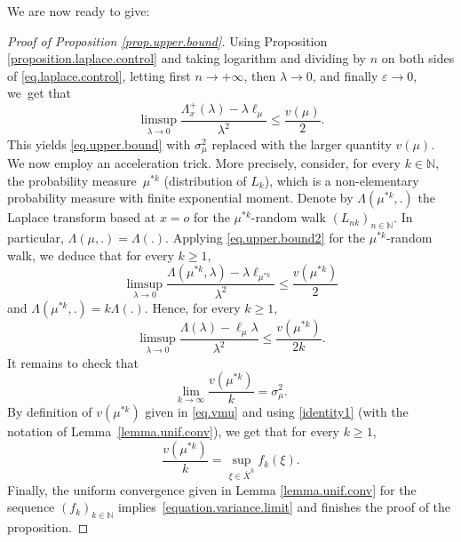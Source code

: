 \documentclass[JEP,XML,SOM,Unicode,published]{cedram}
\let\epsilon\varepsilon
\theoremstyle{plain}
\theoremstyle{definition}
\newcommand\N{\mathbb{N}}
\begin{document}
We are now ready to give:
\begin{proof}[Proof of Proposition \ref{prop.upper.bound}]
Using Proposition \ref{proposition.laplace.control}
and taking logarithm and dividing by $n$ on both sides of \eqref{eq.laplace.control}, letting first $n\to +\infty$, then $\lambda\to 0$, and finally $\epsilon\to 0$, we~get that
\begin{equation}\label{eq.upper.bound2} \limsup_{\lambda\to 0}
\frac{\Lambda_x^+(\lambda)-\lambda \ell_\mu}{\lambda^2}\leq \frac{v(\mu)}{2}.
\end{equation}
This yields \eqref{eq.upper.bound} with $\sigma_{\mu}^2$ replaced with the larger quantity $v(\mu)$. We now employ an acceleration trick. More precisely, consider, for every $k\in \N$, the probability measure~$\mu^{\ast k}$ (distribution of $L_k$), which is a non-elementary probability measure with finite exponential moment. Denote by $\Lambda(\mu^{\ast k},.)$ the Laplace transform based at $x=o$ for the $\mu^{\ast k}$-random walk $(L_{nk})_{n \in \N}$. In particular, $\Lambda(\mu,.)=\Lambda(.)$. Applying \eqref{eq.upper.bound2} for the
$\mu^{\ast k}$-random walk, we deduce that for every $k\geq 1$,
\[
\limsup_{\lambda\to 0}\frac{\Lambda({\mu^{\ast k}},\lambda)- \lambda \ell_{\mu^{\ast k}}}{\lambda^2}\leq \frac{ v(\mu^{\ast k})}{2}
\]
and $\Lambda({\mu^{\ast k}},.)=k \Lambda(.)$. Hence, for every $k \geq 1$,
\[
\limsup_{\lambda\to 0}\frac{\Lambda(\lambda)- \ell_\mu \lambda}{\lambda^2}\leq \frac{ v(\mu^{\ast k})}{2k}.
\]
It remains to check that
\begin{equation}\label{equation.variance.limit}
\lim_{k\to \infty}{\frac{v(\mu^{\ast k})}{k}}=\sigma_{\mu}^2.\end{equation}
By definition of $v(\mu^{\ast k})$ given in \eqref{eq.vmu} and using \eqref{identity1} (with the notation of Lem\-ma~\ref{lemma.unif.conv}), we get that for every $k \geq 1$,
\[
\frac{v(\mu^{\ast k})}{k}=\sup_{\xi\in \overline{X}^h}f_k(\xi).
\]
Finally, the uniform convergence given in Lemma \ref{lemma.unif.conv} for the sequence $(f_k)_{k\in \N}$ implies~\eqref{equation.variance.limit} and finishes the proof of the proposition.
\end{proof}
\end{document}
